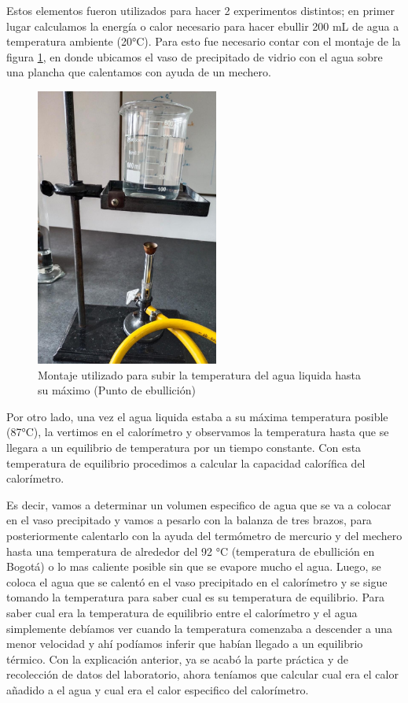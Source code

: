 \documentclass[journal,transmag]{IEEEtran}
\begin{document}
 Estos elementos fueron utilizados para hacer 2 experimentos distintos; en primer lugar calculamos la energía o calor necesario para hacer ebullir 200 mL de agua a temperatura ambiente (20°C). Para esto fue necesario contar con el montaje de la figura \ref{fi1}, en donde ubicamos el vaso de precipitado de vidrio con el agua sobre una plancha que calentamos con ayuda de un mechero. 
 \begin{figure}[!h]
				\center
				\includegraphics[width=6cm]{img/montaje.jpeg}
				\caption{Montaje utilizado para subir la temperatura del agua liquida hasta su máximo (Punto de ebullición)}
				\label{fi1}
			\end{figure}
 

 Por otro lado, una vez el agua liquida estaba a su máxima temperatura posible (87°C), la vertimos en el calorímetro y observamos la temperatura hasta que se llegara a un equilibrio de temperatura por un tiempo constante. Con esta temperatura de equilibrio procedimos a calcular la capacidad calorífica del calorímetro. 

Es decir, vamos a determinar un volumen especifico de agua que se va a colocar en el vaso precipitado y vamos a pesarlo con la balanza de tres brazos, para posteriormente calentarlo con la ayuda del termómetro de mercurio y del mechero hasta una temperatura de alrededor del 92 °C (temperatura de ebullición en Bogotá) o lo mas caliente posible sin que se evapore mucho el agua. Luego, se coloca el agua que se calentó en el vaso precipitado en el calorímetro y se sigue tomando la temperatura para saber cual es su temperatura de equilibrio.
Para saber cual era la temperatura de equilibrio entre el calorímetro y el agua simplemente debíamos ver cuando la temperatura comenzaba a descender a una menor velocidad y ahí podíamos inferir que habían llegado a un equilibrio térmico. Con la explicación anterior, ya se acabó la parte práctica y de recolección de datos del laboratorio, ahora teníamos que calcular cual era el calor añadido a el agua y cual era el calor especifico del calorímetro.
\end{document}
